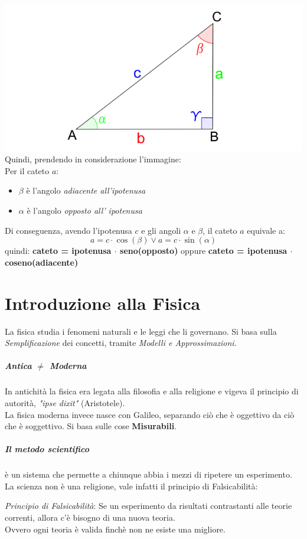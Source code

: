 \documentclass[12pt, a4paper, openany]{book}
\begin{document}
\includegraphics[width=\textwidth]{triangoloRettangolo.png}
Quindi, prendendo in considerazione l'immagine:
\\Per il cateto $a$:
\begin{itemize} %
    \item  $\beta$ è l'angolo \emph{adiacente all'ipotenusa}
    \item  $\alpha$ è l'angolo \emph{opposto all' ipotenusa}
\end{itemize}
Di conseguenza, avendo l'ipotenusa $c$ e gli angoli $\alpha$ e $\beta$, il cateto $a$ equivale a:
\[ a = c\cdot \cos(\beta) \vee a = c\cdot \sin(\alpha) \]
quindi: \textbf{cateto = ipotenusa $\cdot$ seno(opposto)} oppure \textbf{cateto = ipotenusa $\cdot$ coseno(adiacente)}
\chapter{Introduzione alla Fisica}

La fisica studia i fenomeni naturali e le leggi che li governano.
Si basa sulla \emph{Semplificazione} dei concetti, tramite \emph{Modelli e Approssimazioni}.


\paragraph{Antica $\neq$ Moderna} In antichità la fisica era legata alla filosofia e alla religione
e vigeva il principio di autorità, \emph{"ipse dixit"} (Aristotele).
\\La fisica moderna invece nasce con Galileo, separando ciò che è oggettivo da ciò che è soggettivo.
Si basa sulle cose \textbf{Misurabili}.
\paragraph{Il metodo scientifico} è un sistema che permette a chiunque abbia i mezzi di ripetere un esperimento.
La scienza non è una religione, vale infatti il principio di Falsicabilità:
\begin{center}
    \emph{Principio di Falsicabilità}: Se un esperimento da risultati contrastanti alle teorie correnti, allora c'è bisogno di una nuova teoria.
    \\Ovvero ogni teoria è valida finchè non ne esiste una migliore.
\end{center}
\end{document}
